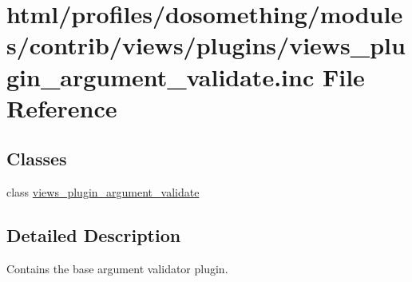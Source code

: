 \hypertarget{views__plugin__argument__validate_8inc}{
\section{html/profiles/dosomething/modules/contrib/views/plugins/views\_\-plugin\_\-argument\_\-validate.inc File Reference}
\label{views__plugin__argument__validate_8inc}
}
\subsection*{Classes}
\begin{DoxyCompactItemize}
\item 
class \hyperlink{classviews__plugin__argument__validate}{views\_\-plugin\_\-argument\_\-validate}
\end{DoxyCompactItemize}


\subsection{Detailed Description}
Contains the base argument validator plugin. 